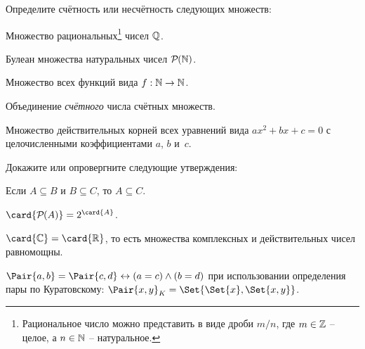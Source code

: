 \documentclass[a4paper,12pt]{article}
\begin{document}
\begin{tasks}
    \item Определите счётность или несчётность следующих множеств:

    \begin{subtasks}
        \item Множество рациональных\footnote{Рациональное число можно представить в виде дроби $m / n$, где $m \in \mathbb{Z}$ \--- целое, а $n \in \mathbb{N}$ \--- натуральное.} чисел $\mathbb{Q}$.
        \item Булеан множества натуральных чисел $\mathcal{P}\mkern-1mu({\mathbb{N}})$.
        \item Множество всех функций вида $f : \mathbb{N} \to \mathbb{N}$.
        \item Объединение \textit{счётного} числа счётных множеств.
        \item Множество действительных корней всех уравнений вида $ax^2 + bx + c = 0$ с целочисленными коэффициентами $a$, $b$ и~$c$.
    \end{subtasks}


    \item Докажите или опровергните следующие утверждения:

    \begin{subtasks}
        \item Если $A \subseteq B$ и $B \subseteq C$, то $A \subseteq C$.
        \item $\card{\powerset{A}} = 2^{\card{A}}$.
        \item $\card{\Complex} = \card{\Real}$, то есть множества комплексных и действительных чисел равномощны.
        \item $\Pair{a,b} = \Pair{c,d} \iff (a = c) \land (b = d)$ при использовании определения пары по Куратовскому: $\Pair{x, y}_K = \Set{\Set{x}, \Set{x, y}}$.
    \end{subtasks}

\end{tasks}
\end{document}
